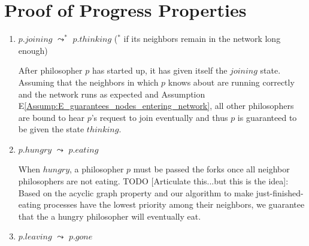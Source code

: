 \documentclass[11pt]{article}
\begin{document}
\section{Proof of Progress Properties}
\begin{enumerate}[PG1]
\item
$p.joining$ $\leadsto^*$ $p.thinking$ ($^*$ if its neighbors remain in the network long enough) 

\indent After philosopher $p$ has started up, it has given itself the $joining$ state. Assuming that the neighbors in which $p$ knows about are running correctly and the network runs as expected and Assumption E\ref{Assump:E_guarantees_nodes_entering_network}, all other philosophers are bound to hear $p$'s request to join eventually and thus $p$ is guaranteed to be given the state $thinking$.

\item  $p.hungry$ $\leadsto$ $p.eating$

\indent When $hungry$, a philosopher $p$ must be passed the forks once all neighbor philosophers are not eating. TODO [Articulate this...but this is the idea]: Based on the acyclic graph property and our algorithm to make just-finished-eating processes have the lowest priority among their neighbors, we guarantee that the a hungry philosopher will eventually eat.

\item 
$p.leaving$ $\leadsto$ $p.gone$
\end{enumerate}
\end{document}
